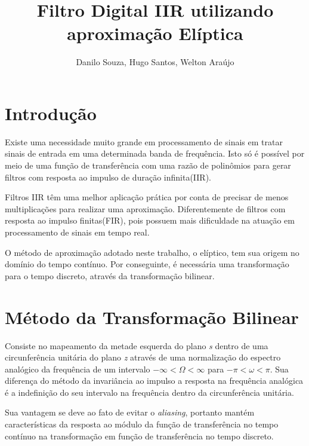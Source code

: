 \documentclass[a4paper,10pt]{article}
\title{Filtro Digital IIR utilizando aproximação Elíptica}
\author{Danilo Souza, Hugo Santos, Welton Araújo}
\begin{document}
\maketitle

\section{Introdução}
Existe uma necessidade muito grande em processamento de sinais em tratar sinais de entrada em uma determinada banda de frequência. Isto só é possível por meio de uma função de transferência com uma razão de polinômios para gerar filtros com resposta ao impulso de duração infinita(IIR).

Filtros IIR têm uma melhor aplicação prática por conta de precisar de menos multiplicações para realizar uma aproximação. Diferentemente de filtros com resposta ao impulso finitas(FIR), pois possuem mais dificuldade na atuação em processamento de sinais em tempo real.

O método de aproximação adotado neste trabalho, o elíptico, tem sua origem no domínio do tempo contínuo. Por conseguinte, é necessária uma transformação para o tempo discreto, através da transformação bilinear.

\section{Método da Transformação Bilinear}
Consiste no mapeamento da metade esquerda do plano \textit{s} dentro de uma circunferência unitária do plano \textit{z} através de uma normalização do espectro analógico da frequência de um intervalo \(-\infty < \Omega < \infty\) para \(-\pi < \omega < \pi\). Sua diferença do método da invariância ao impulso a resposta na frequência analógica é a indefinição do seu intervalo na frequência dentro da circunferência unitária.

Sua vantagem se deve ao fato de evitar o \textit{aliasing}, portanto mantém características da resposta ao módulo da função de transferência no tempo contínuo na transformação em função de transferência no tempo discreto. %

\end{document}

